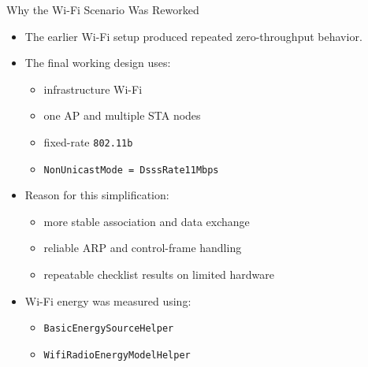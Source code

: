 \documentclass[aspectratio=169]{beamer}
\begin{document}
\begin{frame}{Why the Wi-Fi Scenario Was Reworked}
  \begin{itemize}
    \item The earlier Wi-Fi setup produced repeated zero-throughput behavior.
    \item The final working design uses:
    \begin{itemize}
      \item infrastructure Wi-Fi
      \item one AP and multiple STA nodes
      \item fixed-rate \texttt{802.11b}
      \item \texttt{NonUnicastMode = DsssRate11Mbps}
    \end{itemize}
    \item Reason for this simplification:
    \begin{itemize}
      \item more stable association and data exchange
      \item reliable ARP and control-frame handling
      \item repeatable checklist results on limited hardware
    \end{itemize}
    \item Wi-Fi energy was measured using:
    \begin{itemize}
      \item \texttt{BasicEnergySourceHelper}
      \item \texttt{WifiRadioEnergyModelHelper}
    \end{itemize}
  \end{itemize}
\end{frame}
\end{document}
